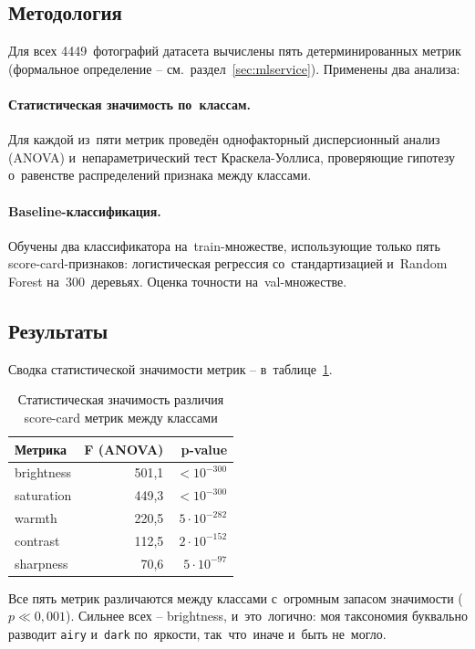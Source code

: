 \documentclass[a4paper,12pt]{diplom}
\begin{document}
\subsection{Методология}

Для всех 4449~фотографий датасета вычислены пять детерминированных метрик (формальное определение -- см.~раздел~\ref{sec:mlservice}). Применены два анализа:

\paragraph{Статистическая значимость по~классам.} Для каждой из~пяти метрик проведён однофакторный дисперсионный анализ (ANOVA) и~непараметрический тест Краскела-Уоллиса, проверяющие гипотезу о~равенстве распределений признака между классами.

\paragraph{Baseline-классификация.} Обучены два классификатора на~train-множестве, использующие только пять score-card-признаков: логистическая регрессия со~стандартизацией и~Random Forest на~300~деревьях. Оценка точности на~val-множестве.

\subsection{Результаты}

Сводка статистической значимости метрик -- в~таблице~\ref{tab:anova}.

\begin{table}[!ht]
\caption{Статистическая значимость различия score-card метрик между классами}
\label{tab:anova}
\centering
\begin{tabular}{lrr}
\toprule
\textbf{Метрика} & \textbf{F (ANOVA)} & \textbf{p-value} \\
\midrule
brightness  & 501{,}1 & $< 10^{-300}$ \\
saturation  & 449{,}3 & $< 10^{-300}$ \\
warmth      & 220{,}5 & $5 \cdot 10^{-282}$ \\
contrast    & 112{,}5 & $2 \cdot 10^{-152}$ \\
sharpness   &  70{,}6 & $5 \cdot 10^{-97}$  \\
\bottomrule
\end{tabular}
\end{table}

Все пять метрик различаются между классами с~огромным запасом значимости ($p \ll 0{,}001$). Сильнее всех -- brightness, и~это~логично: моя таксономия буквально разводит \texttt{airy} и~\texttt{dark} по~яркости, так~что~иначе и~быть не~могло.
\end{document}
